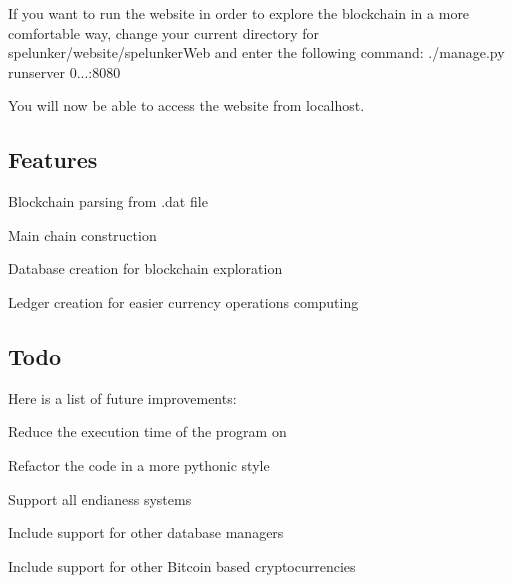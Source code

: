 If you want to run the website in order to explore the blockchain in a more comfortable way, change your current directory for spelunker/website/spelunker\+Web and enter the following command\+: ./manage.py runserver 0...\+:8080

You will now be able to access the website from localhost.

\subsection*{Features }


\begin{DoxyEnumerate}
\item Blockchain parsing from .dat file
\item Main chain construction
\item Database creation for blockchain exploration
\item Ledger creation for easier currency operations computing
\end{DoxyEnumerate}

\subsection*{Todo }

Here is a list of future improvements\+:
\begin{DoxyEnumerate}
\item Reduce the execution time of the program on
\item Refactor the code in a more pythonic style
\item Support all endianess systems
\item Include support for other database managers
\item Include support for other Bitcoin based cryptocurrencies 
\end{DoxyEnumerate}